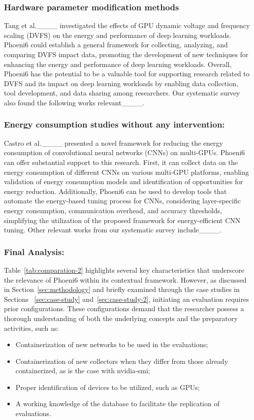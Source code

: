 \subsubsection{Hardware parameter modification methods}
Tang et al.____ investigated the effects of GPU dynamic voltage and frequency scaling (DVFS) on the energy and performance of deep learning workloads.
Phoeni6 could establish a general framework for collecting, analyzing, and comparing DVFS impact data, promoting the development of new techniques for enhancing the energy and performance of deep learning workloads. Overall, Phoeni6 has the potential to be a valuable tool for supporting research related to DVFS and its impact on deep learning workloads by enabling data collection, tool development, and data sharing among researchers.
%
Our systematic survey also found the following works relevant____.

\subsubsection{Energy consumption studies without any intervention:} 
Castro et al.____ presented a novel framework for reducing the energy consumption of convolutional neural networks (CNNs) on multi-GPUs.
Phoeni6 can offer substantial support to this research. First, it can collect data on the energy consumption of different CNNs on various multi-GPU platforms, enabling validation of energy consumption models and identification of opportunities for energy reduction. Additionally, Phoeni6 can be used to develop tools that automate the energy-based tuning process for CNNs, considering layer-specific energy consumption, communication overhead, and accuracy thresholds, simplifying the utilization of the proposed framework for energy-efficient CNN tuning.
%
Other relevant works from our systematic survey include____.

\subsubsection{Final Analysis:} 

Table~\ref{tab:comparation-2} highlights several key characteristics that underscore the relevance of Phoeni6 within its contextual framework. However, as discussed in Section~\ref{sec:methodology} and briefly examined through the case studies in Sections ~\ref{sec:case-study} and~\ref{sec:case-study-2}, initiating an evaluation requires prior configurations. These configurations demand that the researcher possess a thorough understanding of both the underlying concepts and the preparatory activities, such as:

\begin{itemize}
    \item Containerization of new networks to be used in the evaluations;
    \item Containerization of new collectors when they differ from those already containerized, as is the case with nvidia-smi;
    \item Proper identification of devices to be utilized, such as GPUs;
    \item A working knowledge of the database to facilitate the replication of evaluations.
\end{itemize}